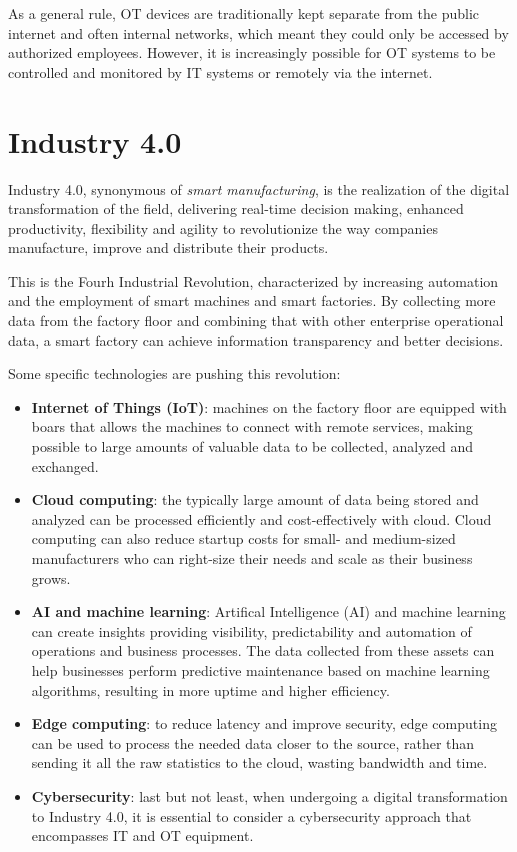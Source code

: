 As a general rule, OT devices are traditionally kept separate from the public internet and often internal networks, which meant they could only be accessed by authorized employees. However, it is increasingly possible for OT systems to be controlled and monitored by IT systems or remotely via the internet.~\cite{it-vs-ot-cybersecurity}

\section{Industry 4.0}

Industry 4.0, synonymous of \textit{smart manufacturing}, is the realization of the digital transformation of the field, delivering real-time decision making, enhanced productivity, flexibility and agility to revolutionize the way companies manufacture, improve and distribute their products.

This is the Fourh Industrial Revolution, characterized by increasing automation and the employment of smart machines and smart factories. By collecting more data from the factory floor and combining that with other enterprise operational data, a smart factory can achieve information transparency and better decisions.

Some specific technologies are pushing this revolution:~\cite{what-is-industry-4-0}
\begin{itemize}
  \item \textbf{Internet of Things (IoT)}: machines on the factory floor are equipped with boars that allows the machines to connect with remote services, making possible to large amounts of valuable data to be collected, analyzed and exchanged.
  \item \textbf{Cloud computing}: the typically large amount of data being stored and analyzed can be processed efficiently and cost-effectively with cloud. Cloud computing can also reduce startup costs for small- and medium-sized manufacturers who can right-size their needs and scale as their business grows.
  \item \textbf{AI and machine learning}: Artifical Intelligence (AI) and machine learning can create insights providing visibility, predictability and automation of operations and business processes. The data collected from these assets can help businesses perform predictive maintenance based on machine learning algorithms, resulting in more uptime and higher efficiency.
  \item \textbf{Edge computing}: to reduce latency and improve security, edge computing can be used to process the needed data closer to the source, rather than sending it all the raw statistics to the cloud, wasting bandwidth and time.
  \item \textbf{Cybersecurity}: last but not least, when undergoing a digital transformation to Industry 4.0, it is essential to consider a cybersecurity approach that encompasses IT and OT equipment.
\end{itemize}

